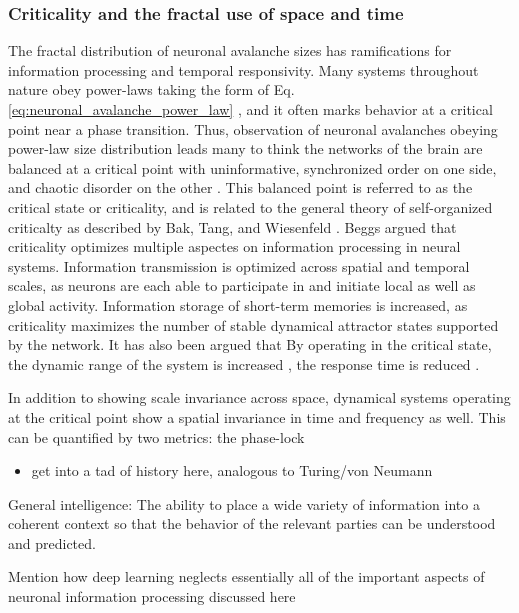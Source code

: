 \documentclass[twocolumn]{article}
\begin{document}
\subsubsection{Criticality and the fractal use of space and time}
The fractal distribution of neuronal avalanche sizes has ramifications for information processing and temporal responsivity. Many systems throughout nature obey power-laws taking the form of Eq.\,\ref{eq:neuronal_avalanche_power_law} \cite{ba2005_baks_book,dover_book_on_fractals}, and it often marks behavior at a critical point near a phase transition. Thus, observation of neuronal avalanches obeying power-law size distribution leads many to think the networks of the brain are balanced at a critical point with uninformative, synchronized order on one side, and chaotic disorder on the other \cite{be2007}. This balanced point is referred to as the critical state or criticality, and is related to the general theory of self-organized criticalty as described by Bak, Tang, and Wiesenfeld \cite{bata1987,bata1988,ba2005}. Beggs argued \cite{be2008} that criticality optimizes multiple aspectes on information processing in neural systems. Information transmission is optimized across spatial and temporal scales, as neurons are each able to participate in and initiate local as well as global activity. Information storage of short-term memories is increased, as criticality maximizes the number of stable dynamical attractor states supported by the network. It has also been argued that  By operating in the critical state, the dynamic range of the system is increased \cite{kico2006,shya2009}, the response time is reduced \cite{}.

In addition to showing scale invariance across space, dynamical systems operating at the critical point show a spatial invariance in time and frequency as well. This can be quantified by two metrics: the phase-lock

\begin{itemize}
\item get into a tad of history here, analogous to Turing/von Neumann
\end{itemize}

General intelligence: The ability to place a wide variety of information into a coherent context so that the behavior of the relevant parties can be understood and predicted.

Mention how deep learning neglects essentially all of the important aspects of neuronal information processing discussed here
\end{document}
